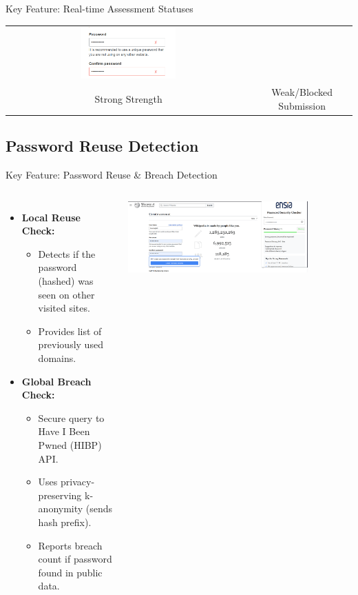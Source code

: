 \documentclass[aspectratio=169]{beamer}
\begin{document}
\begin{frame}{Key Feature: Real-time Assessment Statuses}
\begin{tabular}{cc}
      \includegraphics[width=0.4\textwidth]{red.png} \\
      \small Strong Strength & \small Weak/Blocked Submission \\
  \end{tabular}
\end{frame}

\subsection{Password Reuse Detection}
\begin{frame}{Key Feature: Password Reuse \& Breach Detection}
  \begin{columns}
    \begin{itemize}
      \item \textbf{Local Reuse Check:}
      \begin{itemize}
        \item Detects if the password (hashed) was seen on other visited sites.
        \item Provides list of previously used domains.
      \end{itemize}
      \item \textbf{Global Breach Check:}
      \begin{itemize}
        \item Secure query to Have I Been Pwned (HIBP) API.
        \item Uses privacy-preserving k-anonymity (sends hash prefix).
        \item Reports breach count if password found in public data.
      \end{itemize}
    \end{itemize}
    \centering
    \includegraphics[width=0.8\textwidth]{checker.png}
  \end{columns}
\end{frame}
\end{document}

